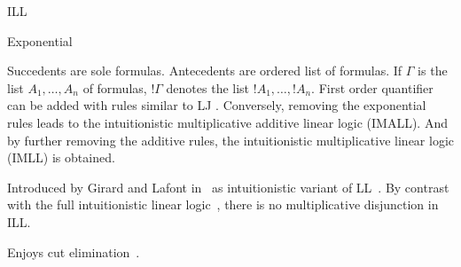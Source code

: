 \begin{entry}{ILL}
\begin{calculus}
\begin{infruleset}{Exponential}
  \sepproof
  \sepproof
  \sepproof
\end{infruleset}

\vspace{-1em}


\end{calculus}

\begin{clarifications}
  Succedents are sole formulas.
  Antecedents are ordered list of formulas.
  If $\Gamma$ is the list $A_1, \ldots, A_n$ of formulas, $!\Gamma$ denotes the list $!A_1, \ldots, !A_n$.
  First order quantifier can be added with rules similar to LJ .
  Conversely, removing the exponential rules leads to the intuitionistic multiplicative additive linear logic (IMALL).
  And by further removing the additive rules, the intuitionistic multiplicative linear logic (IMLL) \cite{mints1977closed} is obtained.
\end{clarifications}

\begin{history}
  Introduced by Girard and Lafont in~\cite{lafont1987tapsoft} as intuitionistic variant of LL~.
  By contrast with the full intuitionistic linear logic~, there is no multiplicative disjunction in ILL.
\end{history}

\begin{technicalities}
  Enjoys cut elimination~\cite{lafont1987tapsoft}.
\end{technicalities}



%
%
%
%
%
%
% 
%




\end{entry}
